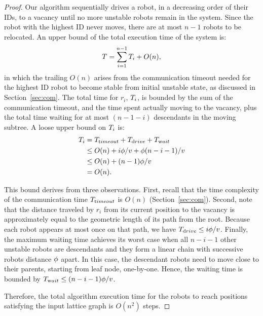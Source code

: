 \begin{proof}
    Our algorithm sequentially drives a robot, in a decreasing order of their IDs, to a vacancy until no more unstable robots remain in the system. 
    Since the robot with the highest ID never moves, there
    are at most $n-1$ robots to be relocated. 
    An upper bound of the
    total execution time of the system is:
      $$ T = \sum\limits_{i=1}^{n-1}T_i + O(n), $$
    in which the trailing $O(n)$ arises from the communication timeout needed
    for the highest ID robot to become stable from initial unstable state, as discussed in Section~\ref{sec:com}.
    The total time for $r_i$, $T_i$, is bounded by the sum of the
    communication timeout, and the time spent actually moving to the vacancy,
    plus the total time waiting for at most $(n-1-i)$ descendants in the moving
    subtree. 
    A loose upper bound on $T_i$ is:
    \begin{equation*}
     \label{eq:timebound}
      \begin{split}
        T_i & = T_{\textrm timeout} + T_{\textrm drive} + T_{\textrm wait}  \\
        & \leq O(n)+ i\phi/v + \phi(n-i-1)/v \\
        & \leq O(n) + (n-1)\phi/v\\
        & = O(n).
      \end{split}
    \end{equation*}
    
    This bound derives from three observations.
    First, recall that the time complexity of the communication time $T_{\textrm timeout}$ is $O(n)$ (Section~\ref{sec:com}).  
    Second, note that
    the distance traveled by $r_i$ from its current position to the vacancy is
    approximately equal to the geometric length of its path from the root.
    Because each robot appears at most once on that path, we have $T_{\textrm drive}\leq i\phi/v$. 
    Finally, the maximum waiting time achieves its
    worst case when all $n-i-1$ other unstable robots are descendants and they
    form a linear chain with successive robots distance $\phi$ apart.  
    In this case, the descendant robots need to move close to their parents,
    starting from leaf node, one-by-one. 
    Hence, the waiting time is bounded by
    $T_{\textrm wait}\leq(n-i-1)\phi/v$.
    
    Therefore, the total algorithm execution time for the robots to reach positions satisfying the input lattice graph
    is  $O(n^2)$ steps.
\end{proof}

